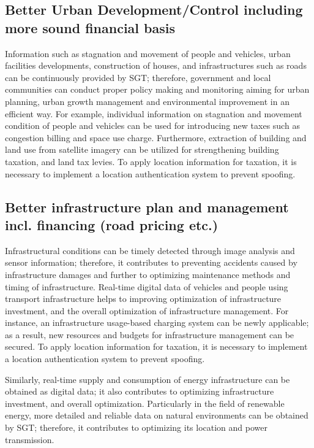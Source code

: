 \subsection{Better Urban Development/Control including more sound financial basis}

\tab Information such as stagnation and movement of people and vehicles, urban facilities developments, construction of houses, and infrastructures such as roads can be continuously provided by SGT; therefore, government and local communities can conduct proper policy making and monitoring aiming for urban planning, urban growth management and environmental improvement in an efficient way. For example, individual information on stagnation and movement condition of people and vehicles can be used for introducing new taxes such as congestion billing and space use charge. Furthermore, extraction of building and land use from satellite imagery can be utilized for strengthening building taxation, and land tax levies. To apply location information for taxation, it is necessary to implement a location authentication system to prevent spoofing.

\subsection{Better infrastructure plan and management incl. financing (road pricing etc.)}

\tab Infrastructural conditions can be timely detected through image analysis and sensor information; therefore, it contributes to preventing accidents caused by infrastructure damages and further to optimizing maintenance methods and timing of infrastructure. Real-time digital data of vehicles and people using transport infrastructure helps to improving optimization of infrastructure investment, and the overall optimization of infrastructure management. For instance, an infrastructure usage-based charging system can be newly applicable; as a result, new resources and budgets for infrastructure management can be secured. To apply location information for taxation, it is necessary to implement a location authentication system to prevent spoofing.

Similarly, real-time supply and consumption of energy infrastructure can be obtained as digital data; it also contributes to optimizing infrastructure investment, and overall optimization. Particularly in the field of renewable energy, more detailed and reliable data on natural environments can be obtained by SGT; therefore, it contributes to optimizing its location and power transmission.

